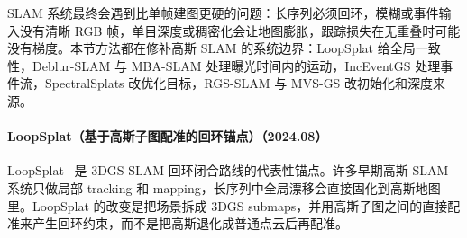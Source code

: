 SLAM 系统最终会遇到比单帧建图更硬的问题：长序列必须回环，模糊或事件输入没有清晰 RGB 帧，单目深度或稠密化会让地图膨胀，跟踪损失在无重叠时可能没有梯度。本节方法都在修补高斯 SLAM 的系统边界：LoopSplat 给全局一致性，Deblur-SLAM 与 MBA-SLAM 处理曝光时间内的运动，IncEventGS 处理事件流，SpectralSplats 改优化目标，RGS-SLAM 与 MVS-GS 改初始化和深度来源。


\paragraph{LoopSplat（基于高斯子图配准的回环锚点）（2024.08）}
LoopSplat~\cite{2408_10154} 是 3DGS SLAM 回环闭合路线的代表性锚点。许多早期高斯 SLAM 系统只做局部 tracking 和 mapping，长序列中全局漂移会直接固化到高斯地图里。LoopSplat 的改变是把场景拆成 3DGS submaps，并用高斯子图之间的直接配准来产生回环约束，而不是把高斯退化成普通点云后再配准。

